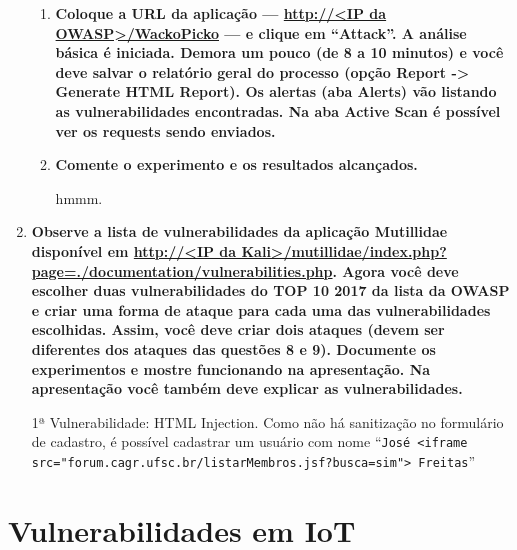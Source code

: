 \documentclass{article}
\begin{document}
\begin{enumerate}
            \begin{enumerate}
                \item \textbf{Coloque a URL da aplicação --- \url{http://<IP da
                        OWASP>/WackoPicko} --- e clique em ``Attack''. A
                        análise básica é iniciada. Demora um pouco (de 8 a 10
                        minutos) e você deve salvar o relatório geral do
                        processo (opção Report -> Generate HTML Report). Os
                        alertas (aba Alerts) vão listando as vulnerabilidades
                        encontradas. Na aba Active Scan é possível ver os
                    requests sendo enviados.}

                \item \textbf{Comente o experimento e os resultados
                    alcançados.}

                    hmmm.
            \end{enumerate}
        \item \textbf{Observe a lista de vulnerabilidades da aplicação
                Mutillidae disponível em \url{http://<IP da
                Kali>/mutillidae/index.php?page=./documentation/vulnerabilities.php}.
                Agora você deve escolher duas vulnerabilidades do TOP 10 2017
                da lista da OWASP e criar uma forma de ataque para cada uma das
                vulnerabilidades escolhidas. Assim, você deve criar dois
                ataques (devem ser diferentes dos ataques das questões 8 e 9).
                Documente os experimentos e mostre funcionando na apresentação.
                Na apresentação você também deve explicar as vulnerabilidades.}

                1ª Vulnerabilidade: HTML Injection. Como não há sanitização no
                formulário de cadastro, é possível cadastrar um usuário com
                nome ``\texttt{José <iframe
            src="forum.cagr.ufsc.br/listarMembros.jsf?busca=sim"> Freitas}''
    \end{enumerate}

    \section{Vulnerabilidades em IoT}
\end{document}
